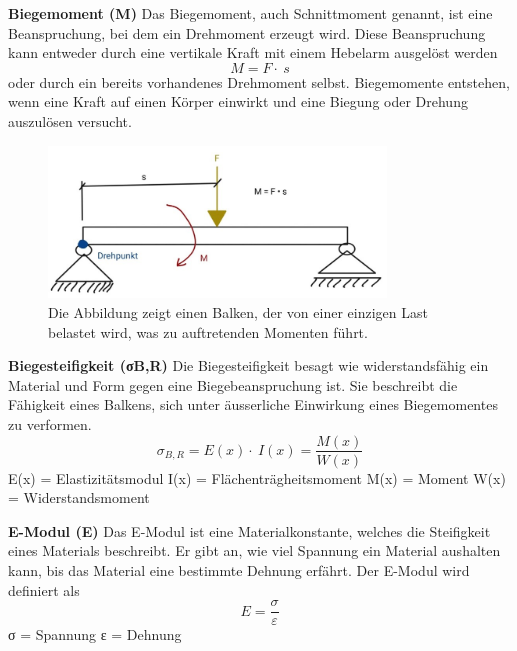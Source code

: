 \textbf{Biegemoment (M)}
Das Biegemoment, auch Schnittmoment genannt, ist eine Beanspruchung, bei dem ein Drehmoment erzeugt wird.
Diese Beanspruchung kann entweder durch eine vertikale Kraft mit einem Hebelarm ausgelöst werden
\begin{equation}
	M=
	F\cdot\ s
\end{equation}
oder durch ein bereits vorhandenes Drehmoment selbst.
Biegemomente entstehen, wenn eine Kraft auf einen Körper einwirkt und eine Biegung oder Drehung auszulösen versucht.
\begin{figure} [h]
	\centering
	\includegraphics[width=0.8\textwidth]{papers/balken/images/teil1/Biegemoment.jpg}
	\caption{Die Abbildung zeigt einen Balken, der von einer einzigen Last belastet wird, was zu auftretenden Momenten führt.}
	\label{fig:Die Abbildung zeigt einen Balken, der von einer einzigen Last belastet wird, was zu auftretenden Momenten führt.}
\end{figure}

\textbf{Biegesteifigkeit (σB,R)}
Die Biegesteifigkeit besagt wie widerstandsfähig ein Material und Form gegen eine Biegebeanspruchung ist.
Sie beschreibt die Fähigkeit eines Balkens, sich unter äusserliche Einwirkung eines Biegemomentes zu verformen.
\begin{equation}
\sigma_{B,R}=E
\left(x\right)\cdot\ I\left(x\right)=
\frac{M(x)}{W(x)}
\end{equation}
E(x) = Elastizitätsmodul
I(x) = Flächenträgheitsmoment
M(x) = Moment 
W(x) = Widerstandsmoment

\textbf{E-Modul (E)}
Das E-Modul ist eine Materialkonstante, welches die Steifigkeit eines Materials beschreibt.
Er gibt an, wie viel Spannung ein Material aushalten kann, bis das Material eine bestimmte Dehnung erfährt.
Der E-Modul wird definiert als
\begin{equation}
E=
\frac{\sigma}{\varepsilon}
\end{equation}
σ = Spannung
ε = Dehnung

